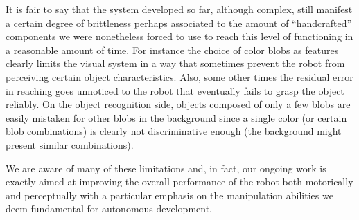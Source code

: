 It is fair to say that the system developed so far, although complex, still manifest a certain degree of brittleness perhaps associated to the amount of ``handcrafted'' components we were nonetheless forced to use to reach this level of functioning in a reasonable amount of time. For instance the choice of color blobs as features clearly limits the visual system in a way that sometimes prevent the robot from perceiving certain object characteristics. Also, some other times the residual error in reaching goes unnoticed to the robot that eventually fails to grasp the object reliably. On the object recognition side, objects composed of only a few blobs are easily mistaken for other blobs in the background since a single color (or certain blob combinations) is clearly not discriminative enough (the background might present similar combinations). 

We are aware of many of these limitations and, in fact, our ongoing work is exactly aimed at improving the overall performance of the robot both motorically and perceptually with a particular emphasis on the manipulation abilities we deem fundamental for autonomous development.




